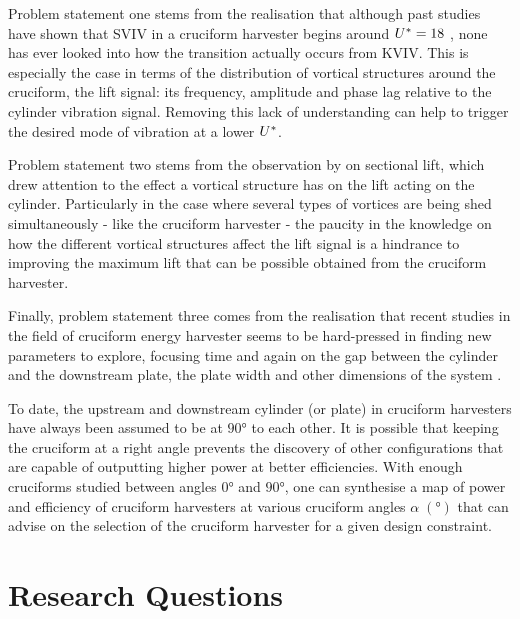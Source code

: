 \documentclass[oneside]{utmthesis}
\begin{document}
Problem statement one stems from the realisation that although past studies have shown that SVIV in a cruciform harvester begins around $U^{*} = 18$ \citep{Koide2013}, none has ever looked into how the transition actually occurs from KVIV. This is especially the case in terms of the distribution of vortical structures around the cruciform, the lift signal: its frequency, amplitude and phase lag relative to the cylinder vibration signal. Removing this lack of understanding can help to trigger the desired mode of vibration at a lower $U^{*}$.

Problem statement two stems from the observation by \citet{Zhao2018a} on sectional lift, which drew attention to the effect a vortical structure has on the lift acting on the cylinder. Particularly in the case where several types of vortices are being shed simultaneously - like the cruciform harvester - the paucity in the knowledge on how the different vortical structures affect the lift signal is a hindrance to improving the maximum lift that can be possible obtained from the cruciform harvester.

Finally, problem statement three comes from the realisation that recent studies in the field of cruciform energy harvester seems to be hard-pressed in finding new parameters to explore, focusing time and again on the gap between the cylinder and the downstream plate, the plate width and other dimensions of the system \citep{Sakamoto2021}.

To date, the upstream and downstream cylinder (or plate) in cruciform harvesters have always been assumed to be at $90 \si{\degree}$ to each other. It is possible that keeping the cruciform at a right angle prevents the discovery of other configurations that are capable of outputting higher power at better efficiencies. With enough cruciforms studied between angles $0 \si{\degree}$ and $90 \si{\degree}$, one can synthesise a map of power and efficiency of cruciform harvesters at various cruciform angles $\alpha \; (\si{\degree})$ that can advise on the selection of the cruciform harvester for a given design constraint.

\section{Research Questions} \label{sec:resQue}

\vspace{\baselineskip}
\end{document}

